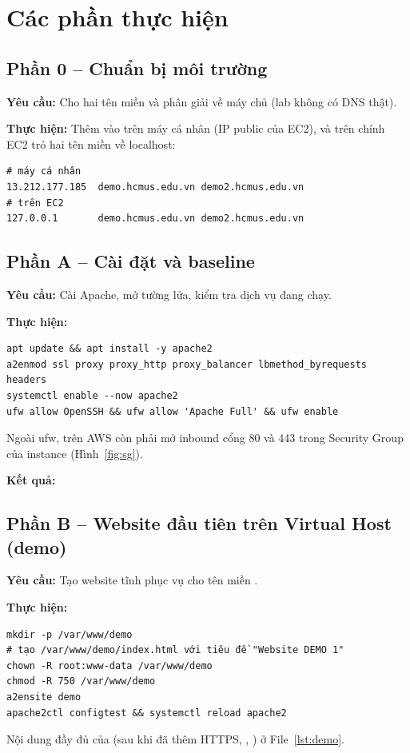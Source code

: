 \section{Các phần thực hiện}

\subsection{Phần 0 -- Chuẩn bị môi trường}
\textbf{\large Yêu cầu:} Cho hai tên miền  và
 phân giải về máy chủ (lab không có DNS thật).

\textbf{\large Thực hiện:} Thêm vào  trên máy cá nhân (IP public
của EC2), và trên chính EC2 trỏ hai tên miền về localhost:
\begin{verbatim}
# máy cá nhân
13.212.177.185  demo.hcmus.edu.vn demo2.hcmus.edu.vn
# trên EC2
127.0.0.1       demo.hcmus.edu.vn demo2.hcmus.edu.vn
\end{verbatim}

\subsection{Phần A -- Cài đặt và baseline}
\textbf{\large Yêu cầu:} Cài Apache, mở tường lửa, kiểm tra dịch vụ đang chạy.

\textbf{\large Thực hiện:}
\begin{verbatim}
apt update && apt install -y apache2
a2enmod ssl proxy proxy_http proxy_balancer lbmethod_byrequests headers
systemctl enable --now apache2
ufw allow OpenSSH && ufw allow 'Apache Full' && ufw enable
\end{verbatim}
Ngoài ufw, trên AWS còn phải mở inbound cổng 80 và 443 trong Security Group
của instance (Hình~\ref{fig:sg}).

\textbf{\large Kết quả:}

\subsection{Phần B -- Website đầu tiên trên Virtual Host (demo)}
\textbf{\large Yêu cầu:} Tạo website tĩnh  phục vụ cho
tên miền .

\textbf{\large Thực hiện:}
\begin{verbatim}
mkdir -p /var/www/demo
# tạo /var/www/demo/index.html với tiêu đề "Website DEMO 1"
chown -R root:www-data /var/www/demo
chmod -R 750 /var/www/demo
a2ensite demo
apache2ctl configtest && systemctl reload apache2
\end{verbatim}
Nội dung đầy đủ của  (sau khi đã thêm HTTPS, ,
) ở File~\ref{lst:demo}.


